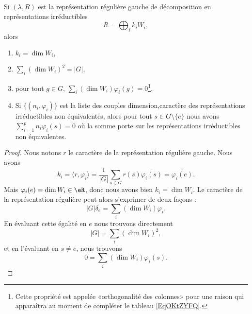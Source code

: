 \begin{proposition} \label{PropYLnxIjk}
    Si \( (\lambda,R)\) est la représentation régulière gauche de décomposition en représentations irréductibles
    \begin{equation}
        R=\bigoplus_ik_iW_i,
    \end{equation}
    alors
    \begin{enumerate}
        \item
            \( k_i=\dim W_i\),
        \item       \label{ITEMooLXIJooDxkGJh}
            \( \sum_i(\dim W_i)^2=|G|\),
        \item   \label{ItemEXAjTIh}
            pour tout \( g\in G\), \( \sum_i(\dim W_i)\varphi_i(g)=0\)\footnote{Cette propriété est appelée «orthogonalité des colonnes» pour une raison qui apparaîtra au moment de compléter le tableau \eqref{EqOKtZYFQ}.}.
        \item
            Si \( \{ (n_i,\varphi_i) \}\) est la liste des couples dimension,caractère des représentations irréductibles non équivalentes, alors pour tout \( s\in G\setminus\{ e \}\) nous avons \( \sum_{i=1}^pn_i\varphi_i(s)=0\) où la somme porte sur les représentations irréductibles non équivalentes.
    \end{enumerate}
\end{proposition}

\begin{proof}
    Nous notons \( r\) le caractère de la représentation régulière gauche. Nous avons
    \begin{equation}
        k_i=\langle r, \varphi_i\rangle =\frac{1}{ | G | }\sum_{s\in G}r(s)\overline{ \varphi_i(s) }=\overline{ \varphi_i(e) }.
    \end{equation}
    Mais \( \varphi_i(e)=\dim W_i\in \eR\), donc nous avons bien \( k_i=\dim W_i\). Le caractère de la représentation régulière peut alors s'exprimer de deux façons :
    \begin{equation}
        | G |\delta_e=\sum_i(\dim W_i)\varphi_i.
    \end{equation}
    En évaluant cette égalité en \( e\) nous trouvons directement
    \begin{equation}
        | G |=\sum_i(\dim W_i)^2,
    \end{equation}
    et en l'évaluant en \( s\neq e\), nous trouvons
    \begin{equation}
        0=\sum_i(\dim W_i)\varphi_i(s).
    \end{equation}
\end{proof} 

